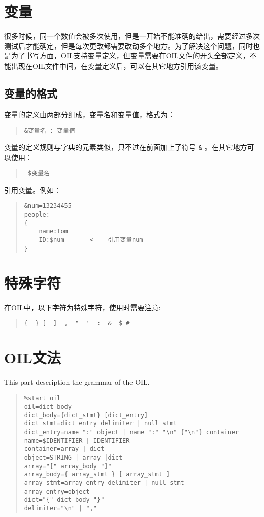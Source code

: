 \documentclass[a4paper]{article}
\begin{document}
\begin{CJK}{UTF8}{song}
\section{变量}
很多时候，同一个数值会被多次使用，但是一开始不能准确的给出，需要经过多次测试后才能确定，但是每次更改都需要改动多个地方。为了解决这个问题，同时也是为了书写方面，OIL支持变量定义，但变量需要在OIL文件的开头全部定义，不能出现在OIL文件中间，在变量定义后，可以在其它地方引用该变量。
\subsection{变量的格式}
变量的定义由两部分组成，变量名和变量值，格式为：
\begin{quote}
\begin{verbatim}
&变量名 : 变量值
\end{verbatim}
\end{quote}
变量的定义规则与字典的元素类似，只不过在前面加上了符号 \verb|&| 。在其它地方可以使用：
\begin{quote}
\begin{verbatim}
 $变量名 
\end{verbatim}
\end{quote}
引用变量。例如：
\begin{quote}
\begin{verbatim}
&num=13234455
people:
{
    name:Tom
    ID:$num       <----引用变量num
}
\end{verbatim}
\end{quote}

\section{特殊字符}
在OIL中，以下字符为特殊字符，使用时需要注意:
\begin{quote}
\begin{verbatim}
{  } [  ]  ,  "  '  :  &  $ #
\end{verbatim}
\end{quote}

\section{OIL文法}
This part description the grammar of the OIL.
\begin{quote}
\begin{verbatim}
%start oil
oil=dict_body
dict_body={dict_stmt} [dict_entry]
dict_stmt=dict_entry delimiter | null_stmt
dict_entry=name ":" object | name ":" "\n" {"\n"} container
name=$IDENTIFIER | IDENTIFIER 
container=array | dict 
object=STRING | array |dict 
array="[" array_body "]"
array_body={ array_stmt } [ array_stmt ] 
array_stmt=array_entry delimiter | null_stmt
array_entry=object 
dict="{" dict_body "}"
delimiter="\n" | ","

\end{verbatim}
\end{quote}

\end{CJK}
\end{document}
